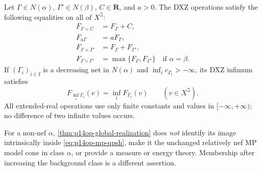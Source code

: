 \begin{theorem}\label{thm:p14op-all-point-operations}
Let \(\Gamma\in N(\alpha)\), \(\Gamma'\in N(\beta)\),
\(C\in\mathbf R\), and \(a>0\). The DXZ operations satisfy
the following equalities on all of \(X^\beth\):
\begin{align}
 F_{\Gamma+C}&=F_\Gamma+C,\label{eq:p14op-translation}\\
 F_{a\Gamma}&=aF_\Gamma,\label{eq:p14op-scaling}\\
 F_{\Gamma+\Gamma'}&=F_\Gamma+F_{\Gamma'},
       \label{eq:p14op-addition}\\
 F_{\Gamma\vee\Gamma'}&=\max\{F_\Gamma,F_{\Gamma'}\}
       \quad\text{if }\alpha=\beta.
       \label{eq:p14op-maximum}
\end{align}
If \((\Gamma_i)_{i\in I}\) is a decreasing net in \(N(\alpha)\)
and \(\inf_i c_{\Gamma_i}>-\infty\), its DXZ infimum satisfies
\begin{equation}\label{eq:p14op-infimum}
 F_{\inf_i\Gamma_i}(v)=\inf_i F_{\Gamma_i}(v)
       \qquad(v\in X^\beth).
\end{equation}
All extended-real operations use only finite constants and values in
\([-\infty,+\infty)\); no difference of two infinite values occurs.
\end{theorem}

For a non-nef \(\alpha\), \cref{thm:p14op-global-realization} does
\emph{not} identify its image intrinsically inside
\eqref{eq:p14op-mp-qpsh}, make it the unchanged relatively nef MP
model cone in class \(\alpha\), or provide a measure or energy theory.
Membership after increasing the background class is a different assertion.
